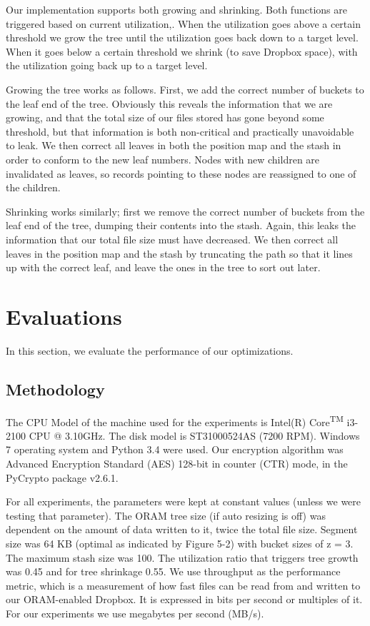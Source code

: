 \documentclass[conference]{IEEEtran}
\begin{document}
Our implementation supports both growing and shrinking. Both functions are triggered based on current utilization,. When the utilization goes above a certain threshold we grow the tree until the utilization goes back down to a target level. When it goes below a certain threshold we shrink (to save Dropbox space), with the utilization going back up to a target level.

Growing the tree works as follows. First, we add the correct number of buckets to the leaf end of the tree. Obviously this reveals the information that we are growing, and that the total size of our files stored has gone beyond some threshold, but that information is both non-critical and practically unavoidable to leak. We then correct all leaves in both the position map and the stash in order to conform to the new leaf numbers. Nodes with new children are invalidated as leaves, so records pointing to these nodes are reassigned to one of the children.

Shrinking works similarly; first we remove the correct number of buckets from the leaf end of the tree, dumping their contents into the stash. Again, this leaks the information that our total file size must have decreased. We then correct all leaves in the position map and the stash by truncating the path so that it lines up with the correct leaf, and leave the ones in the tree to sort out later.

\section{Evaluations}
In this section, we evaluate the performance of our optimizations. 
\subsection{Methodology}

The CPU Model of the machine used for the experiments is Intel(R) Core\textsuperscript{TM} i3-2100 CPU @ 3.10GHz. The disk model is ST31000524AS (7200 RPM). Windows 7 operating system and Python 3.4 were used. Our encryption algorithm was Advanced Encryption Standard (AES) 128-bit in counter (CTR) mode, in the PyCrypto package v2.6.1.

For all experiments, the parameters were kept at constant values (unless we were testing that parameter). The ORAM tree size (if auto resizing is off) was dependent on the amount of data written to it, twice the total file size. Segment size was 64 KB (optimal as indicated by Figure 5-2) with bucket sizes of z = 3.  The maximum stash size was 100. The utilization ratio that triggers tree growth was 0.45 and for tree shrinkage 0.55. We use throughput as the performance metric, which is a measurement of how fast files can be read from and written to our ORAM-enabled Dropbox. It is expressed in bits per second or multiples of it. For our experiments we use megabytes per second (MB/s).
\end{document}
